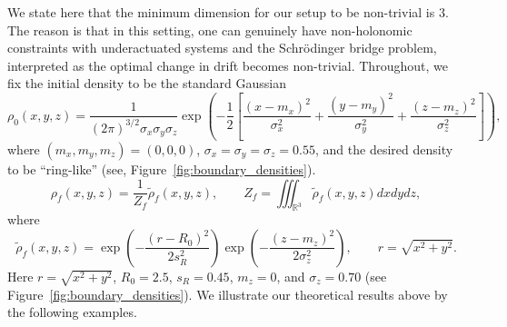 \documentclass{amsart}
\numberwithin{equation}{section}
\begin{document}
We state here that the minimum dimension for our setup to be non-trivial is $3$. The reason is that in this setting, one can genuinely have non-holonomic constraints with underactuated systems and the  Schr\"odinger bridge problem, interpreted as the optimal change in drift
becomes non-trivial. Throughout, we fix the initial density to be the standard Gaussian
 \begin{equation}\label{eq: initial density}
 \rho_0(x,y,z)
=
\frac{1}{(2\pi)^{3/2} \sigma_x\sigma_y\sigma_z} 
\exp\!\left(
-\frac12\left[
\frac{(x-m_x)^2}{\sigma_x^2}
+\frac{(y-m_y)^2}{\sigma_y^2}
+\frac{(z-m_z)^2}{\sigma_z^2}
\right]\right),     
 \end{equation}
where $(m_x,m_y,m_z)=(0,0,0)$, $\sigma_x=\sigma_y=\sigma_z=0.55$, and the desired density to be ``ring-like'' (see, Figure~\ref{fig:boundary_densities}).%
\begin{equation}\label{eq: final density} 
\rho_f(x,y,z)=\frac{1}{Z_f} \tilde\rho_f(x,y,z),
\qquad
Z_f=\iiint_{\mathbb{R}^3}\tilde\rho_f(x,y,z) dx dy dz,    
\end{equation}
where 
\[
\tilde\rho_f(x,y,z)
=
\exp\!\left(-\frac{(r-R_0)^2}{2s_R^2}\right) 
\exp\!\left(-\frac{(z-m_z)^2}{2\sigma_z^2}\right),
\qquad r=\sqrt{x^2+y^2}.
\]
Here $r=\sqrt{x^2+y^2}$,  $R_0=2.5$, $s_R=0.45$, $m_z=0$, and $\sigma_z=0.70$ (see Figure~\ref{fig:boundary_densities}).
We illustrate our theoretical results above by the following examples.
\end{document}
